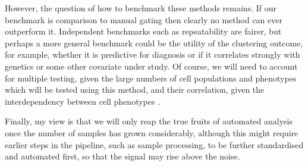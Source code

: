 However, the question of how to benchmark these methods remains.
If our benchmark is comparison to manual gating then clearly no method can ever outperform it.
Independent benchmarks such as repeatability are fairer, but perhaps a more general benchmark could be the utility of the clustering outcome, for example, whether it is predictive for diagnosis or if it correlates strongly with genetics or some other covariate under study.
Of course, we will need to account for multiple testing, given the large numbers of cell populations and phenotypes which will be tested using this method, and their correlation, given the interdependency between cell phenotypes \citep{Roederer:2015eu}.


Finally, my view is that we will only reap the true fruits of automated analysis once the number of samples has grown considerably, although this might require earlier steps in the pipeline, such as sample processing, to be further standardised and automated first, so that the signal may rise above the noise.




%
%









